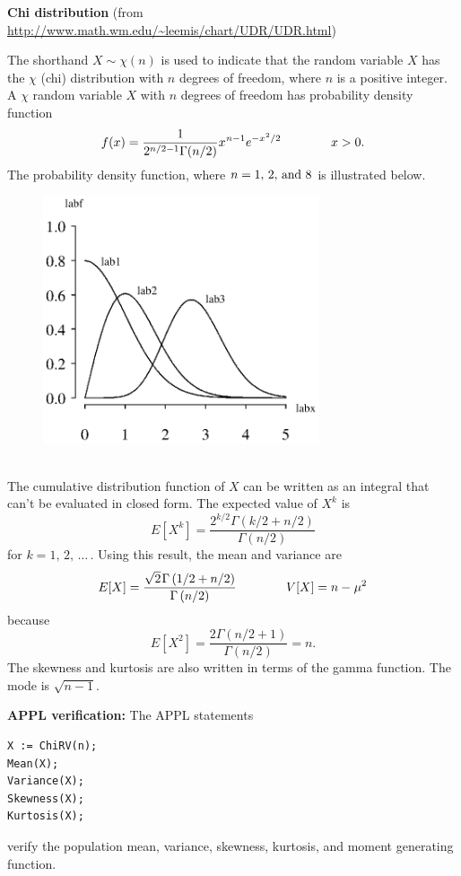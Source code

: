 \documentclass[12pt,fullpage]{article}
\begin{document}
\noindent
{\bf Chi distribution} (from \color{blue}\url{http://www.math.wm.edu/~leemis/chart/UDR/UDR.html}\color{black})

\noindent
The shorthand $X \sim {\chi}(n)$ is used to indicate that the
random variable $X$ has the $\chi$ (chi) distribution with $n$ degrees of freedom, where $n$ is a positive integer.
A $\chi$ random variable $X$ with $n$ degrees of freedom has probability density function 
$$
f(x) = \frac{1}{2 ^ {n / 2 - 1}\Gamma(n / 2)} x ^ {\kern 0.04em n-1}e ^ {-x ^ {\kern 0.04em 2} / 2} \qquad \qquad x>0.
$$
The probability density function, where $n=1,\, 2,\, {\rm and}\  8$ is illustrated below.
{\begin{figure}[h!]
\begin{center}
\includegraphics[width=3.2in]{ChiPlot.ps}
\end{center}
\end{figure}}\\
The cumulative distribution function of $X$ can be written as an integral that can't be
evaluated in closed form.
The expected value of $X^k$ is
$$
E\left[ X ^ k \right] = \frac{2 ^ {k / 2} \Gamma(k / 2 + n / 2)}{\Gamma(n / 2)}
$$
for $k = 1, \, 2, \, \ldots \,$.
Using this result, the mean and variance are
$$
E[X] = \frac {\sqrt {2} \kern 0.08em\Gamma  \left( 1 / 2 + n / 2 \right) }{\Gamma  \left(n / 2 \right) } \qquad \qquad 
V[X] = n - \kern 0.04em \mu ^ 2 
$$
because
$$
E\left[ X ^ 2 \right] = \frac{2 \Gamma(n / 2 + 1)}{\Gamma(n / 2)} = n.
$$
The skewness and kurtosis are also written in terms of the gamma function.
The mode is $\sqrt{n-1}$.

\vspace{0.1in}

\noindent
{\bf APPL verification:}
The APPL statements
\begin{verbatim}
X := ChiRV(n);
Mean(X);
Variance(X);
Skewness(X);
Kurtosis(X);
\end{verbatim}
verify the population mean, variance, skewness, kurtosis, and moment generating function.
\end{document}
